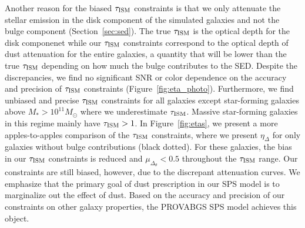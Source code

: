 Another reason for the biased $\tau_{\rm ISM}$ constraints is that we only attenuate
the stellar emission in the disk component of the simulated galaxies and not
the bulge component (Section~\ref{sec:sed}).
The true $\tau_{\rm ISM}$ is the optical depth for the disk componenet while our
$\tau_{\rm ISM}$ constraints correspond to the optical depth of dust attenuation
for the entire galaxies, a quantity that will be lower than the true $\tau_{\rm ISM}$
depending on how much the bulge contributes to the SED. 
Despite the discrepancies, we find no significant SNR or color dependence on
the accuracy and precision of $\tau_{\rm ISM}$ constraints
(Figure~\ref{fig:eta_photo}). 
Furthermore, we find unbiased and precise $\tau_{\rm ISM}$ constraints for all galaxies
except star-forming galaxies above $M_* > 10^{11}M_\odot$ where we underestimate 
$\tau_{\rm ISM}$. 
Massive star-forming galaxies in this regime mainly have $\tau_{\rm ISM} > 1$.
In Figure~\ref{fig:etas}, we present a more apples-to-apples comparison of the
$\tau_{\rm ISM}$ constraints, where we present $\eta_\Delta$ for only galaxies without
bulge contributions (black dotted). 
For these galaxies, the bias in our $\tau_{\rm ISM}$ constraints is reduced and
$\mu_{\Delta_\theta}<0.5$ throughout the $\tau_{\rm ISM}$ range. 
Our constraints are still biased, however, due to the discrepant attenuation
curves. 
We emphasize that the primary goal of dust prescription in our SPS model is to
marginalize out the effect of dust. 
Based on the accuracy and precision of our constraints on other galaxy
properties, the {\sc PROVABGS} SPS model achieves this object.  




